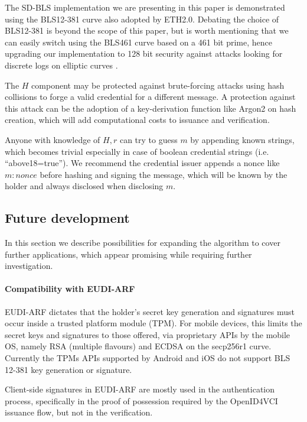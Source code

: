 The SD-BLS implementation we are presenting in this paper is
demonstrated using the BLS12-381 curve \cite{bls381-12} also adopted
by ETH2.0. Debating the choice of BLS12-381 is beyond the scope of
this paper, but is worth mentioning that we can easily switch using
the BLS461 curve based on a 461 bit prime, hence upgrading our
implementation to 128 bit security \cite{updating-key-pairings}
against attacks looking for discrete logs on elliptic curves
\cite{discrete-log-attack}.

The $H$ component may be protected against brute-forcing attacks using
hash collisions to forge a valid credential for a different message. A
protection against this attack can be the adoption of a key-derivation
function like Argon2 \cite{argon2} on hash creation, which will add
computational costs to issuance and verification.

Anyone with knowledge of $H,r$ can try to guess $m$ by appending known
strings, which becomes trivial especially in case of boolean
credential strings (i.e. ``above18=true''). We recommend the
credential issuer appends a nonce like $m:nonce$ before hashing and
signing the message, which will be known by the holder and always
disclosed when disclosing $m$.

\subsection{Future development}

In this section we describe possibilities for expanding the algorithm
to cover further applications, which appear promising while requiring
further investigation.

\paragraph{Compatibility with EUDI-ARF}

EUDI-ARF dictates that the holder's secret key generation and
signatures must occur inside a trusted platform module (TPM). For
mobile devices, this limits the secret keys and signatures to those
offered, via proprietary APIs by the mobile OS, namely RSA (multiple
flavours) and ECDSA on the secp256r1 curve. Currently the TPMs APIs
supported by Android and iOS do not support BLS 12-381 key generation
or signature.

Client-side signatures in EUDI-ARF are mostly used in the
authentication process, specifically in the proof of possession
required by the OpenID4VCI\cite{OID4VCI} issuance flow, but not in the
verification.

